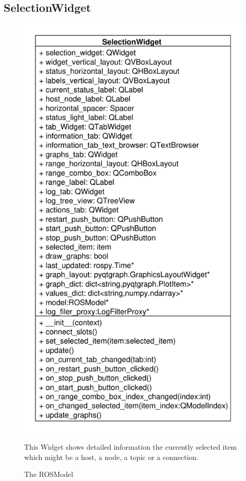 \newpage
\subsection{SelectionWidget}
\begin{figure}[htbp]
	\begin{minipage}[t]{7cm}
		\vspace{0pt}
		\centering
		\includegraphics[scale=0.6]{./diagram_pictures/Selection.pdf}
		\caption{The ROSModel}
	\end{minipage}
	\hfill
	\begin{minipage}[t]{6.5cm}
		\vspace{10pt}
		This Widget shows detailed information the currently selected item which might be a host, a node, a topic or a connection.
	\end{minipage}
\end{figure} 
